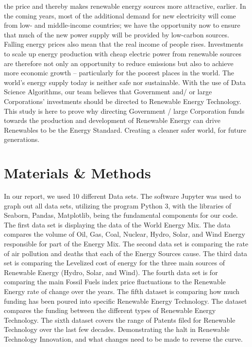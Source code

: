 \documentclass[10pt,twocolumn,letterpaper]{article}
\begin{document}
the price and thereby makes renewable energy sources more attractive, earlier. In the coming years, most of the additional demand for new electricity will come from low- and middle-income countries; we have the opportunity now to ensure that much of the new power supply will be provided by low-carbon sources. Falling energy prices also mean that the real income of people rises. Investments to scale up energy production with cheap electric power from renewable sources are therefore not only an opportunity to reduce emissions but also to achieve more economic growth – particularly for the poorest places in the world.
The world’s energy supply today is neither safe nor sustainable. With the use of Data Science Algorithms, our team believes that Government and/ or large Corporations' investments should be directed to Renewable Energy Technology. This study is here to prove why directing Government / large Corporation funds towards the production and development of Renewable Energy can drive Renewables to be the Energy Standard. Creating a cleaner safer world, for future generations.
\section*{}



\section{Materials \& Methods}

In our report, we used 10 different Data sets. The software Jupyter was used to graph out all data sets, utilizing the program Python 3, with the libraries of Seaborn, Pandas, Matplotlib, being the fundamental components for our code. The first data set is displaying the data of the World Energy Mix. The data compares the volume of Oil, Gas, Coal, Nuclear, Hydro, Solar, and Wind Energy responsible for part of the Energy Mix. The second data set is comparing the rate of air pollution and deaths that each of the Energy Sources cause. The third data set is comparing the Levelized cost of energy for the three main sources of Renewable Energy (Hydro, Solar, and Wind). The fourth data set is for comparing the main Fossil Fuels index price fluctuations to the Renewable Energy rate of change over the years. The fifth dataset is comparing how much funding has been poured into specific Renewable Energy Technology. The dataset compares the funding between the different types of Renewable Energy Technology. The sixth dataset covers the range of Patents filed for Renewable Technology over the last few decades. Demonstrating the halt in Renewable Technology Innovation, and what changes need to be made to reverse the curve.   
\end{document}
